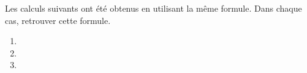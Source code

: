 \documentclass[exercice]{thedocument}%
\begin{document}
%
Les calculs suivants ont été obtenus en utilisant la même formule. Dans
chaque cas, retrouver cette formule.
\begin{enumerate}
    \item\hskip10pt\par{}
    \item\hskip10pt\par{}
    \item\hskip10pt\par{}
\end{enumerate}
\end{document}
